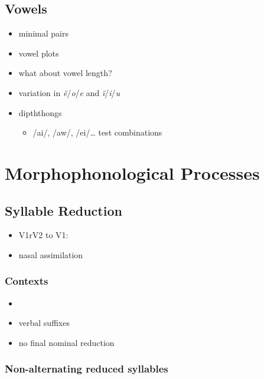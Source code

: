 \documentclass{memoir}
\begin{document}
\subsection{\texorpdfstring{Vowels \label{sec:vowels}}{Vowels }}

\begin{itemize}
\item
  minimal pairs
\item
  vowel plots
\item
  what about vowel length?
\item
  variation in \emph{ë}/\emph{o}/\emph{e} and \emph{ï}/\emph{i}/\emph{u}
\item
  dipththongs

  \begin{itemize}
  \tightlist
  \item
    /ai/, /aw/, /ei/\ldots{} test combinations
  \end{itemize}
\end{itemize}

\section{\texorpdfstring{Morphophonological Processes
\label{sec:morphophono}}{Morphophonological Processes }}

\subsection{\texorpdfstring{Syllable Reduction
\label{sec:sylred}}{Syllable Reduction }}

\begin{itemize}
\tightlist
\item
  V1rV2 to V1:
\item
  nasal assimilation
\end{itemize}

\subsubsection{Contexts}

\begin{itemize}
\item
\item
  verbal suffixes
\item
  no final nominal reduction
\end{itemize}

\subsubsection{Non-alternating reduced syllables}
\end{document}
